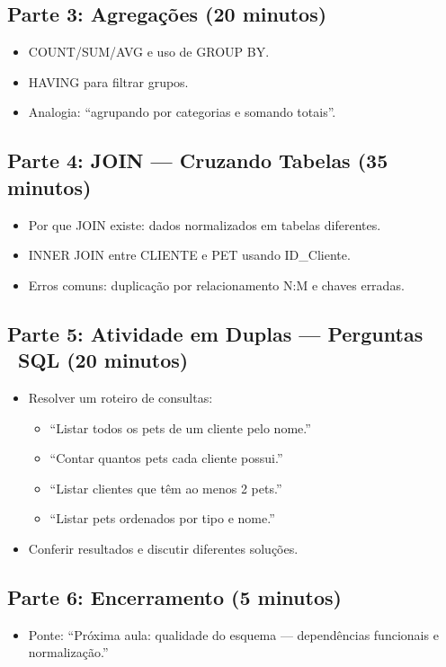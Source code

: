 \documentclass[12pt,a4paper]{article}
\begin{document}
\subsection*{Parte 3: Agregações (20 minutos)}
\begin{itemize}[leftmargin=*,itemsep=0.35em]
  \item COUNT/SUM/AVG e uso de GROUP BY.
  \item HAVING para filtrar grupos.
  \item Analogia: ``agrupando por categorias e somando totais''.
\end{itemize}

\subsection*{Parte 4: JOIN --- Cruzando Tabelas (35 minutos)}
\begin{itemize}[leftmargin=*,itemsep=0.35em]
  \item Por que JOIN existe: dados normalizados em tabelas diferentes.
  \item INNER JOIN entre CLIENTE e PET usando ID\_Cliente.
  \item Erros comuns: duplicação por relacionamento N:M e chaves erradas.
\end{itemize}

\subsection*{Parte 5: Atividade em Duplas --- Perguntas \textrightarrow\ SQL (20 minutos)}
\begin{itemize}[leftmargin=*,itemsep=0.35em]
  \item Resolver um roteiro de consultas:
  \begin{itemize}[leftmargin=*,itemsep=0.25em]
    \item ``Listar todos os pets de um cliente pelo nome.''
    \item ``Contar quantos pets cada cliente possui.''
    \item ``Listar clientes que têm ao menos 2 pets.''
    \item ``Listar pets ordenados por tipo e nome.''
  \end{itemize}
  \item Conferir resultados e discutir diferentes soluções.
\end{itemize}

\subsection*{Parte 6: Encerramento (5 minutos)}
\begin{itemize}[leftmargin=*,itemsep=0.35em]
  \item Ponte: ``Próxima aula: qualidade do esquema --- dependências funcionais e normalização.''
\end{itemize}
\end{document}
